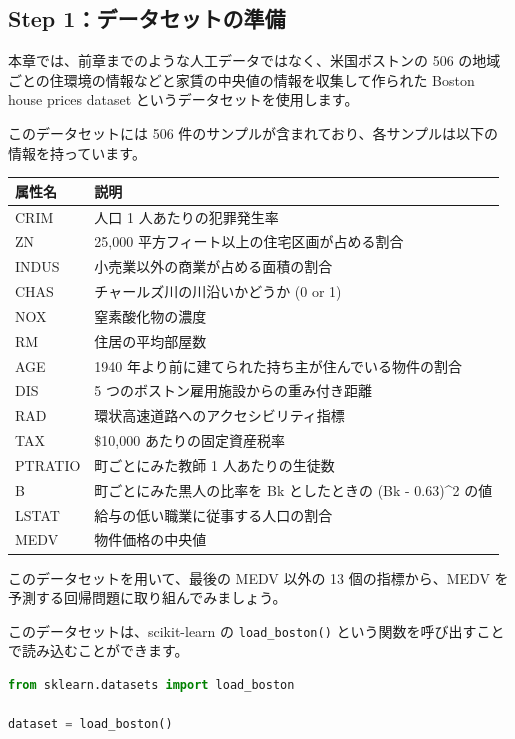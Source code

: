 \subsection{Step 1：データセットの準備}


本章では、前章までのような人工データではなく、米国ボストンの 506 の地域ごとの住環境の情報などと家賃の中央値の情報を収集して作られた Boston house prices dataset というデータセットを使用します。


このデータセットには 506 件のサンプルが含まれており、各サンプルは以下の情報を持っています。


\begin{center}
\begin{tabular}{|l|l|}
\hline
属性名 & 説明 \\
\hline
CRIM & 人口 1 人あたりの犯罪発生率 \\
ZN & 25,000 平方フィート以上の住宅区画が占める割合 \\
INDUS & 小売業以外の商業が占める面積の割合 \\
CHAS & チャールズ川の川沿いかどうか (0 or 1) \\
NOX & 窒素酸化物の濃度 \\
RM & 住居の平均部屋数 \\
AGE & 1940 年より前に建てられた持ち主が住んでいる物件の割合 \\
DIS & 5 つのボストン雇用施設からの重み付き距離 \\
RAD & 環状高速道路へのアクセシビリティ指標 \\
TAX & \$10,000 あたりの固定資産税率 \\
PTRATIO & 町ごとにみた教師 1 人あたりの生徒数 \\
B & 町ごとにみた黒人の比率を Bk としたときの (Bk - 0.63)\textasciicircum{}2 の値 \\
LSTAT & 給与の低い職業に従事する人口の割合 \\
MEDV & 物件価格の中央値 \\
\hline
\end{tabular}
\end{center}


このデータセットを用いて、最後の MEDV 以外の 13 個の指標から、MEDV を予測する回帰問題に取り組んでみましょう。

このデータセットは、scikit-learn の \texttt{load\_boston()} という関数を呼び出すことで読み込むことができます。


\begin{lstlisting}[style=codecell,language=Python]
from sklearn.datasets import load_boston

dataset = load_boston()
\end{lstlisting}

